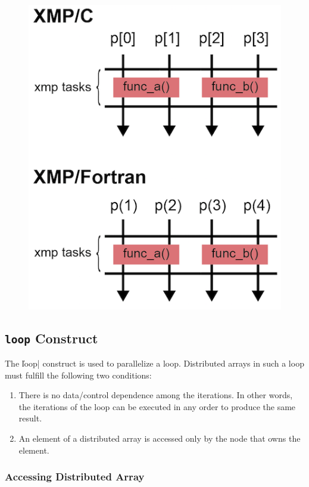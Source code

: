 \begin{figure}
  \centering
  \includegraphics{figs/tasks.png}
\end{figure}


\subsection{{\tt loop} Construct}

The \|loop| construct is used to parallelize a loop. Distributed arrays in
such a loop must fulfill the following two conditions:

\begin{enumerate}
  \item There is no data/control dependence among the iterations. In other
words, the iterations of the loop can be executed in any order to
produce the same result.
  \item An element of a distributed array is accessed only by the node that owns
the element.
\end{enumerate}

\subsubsection{Accessing Distributed Array}

